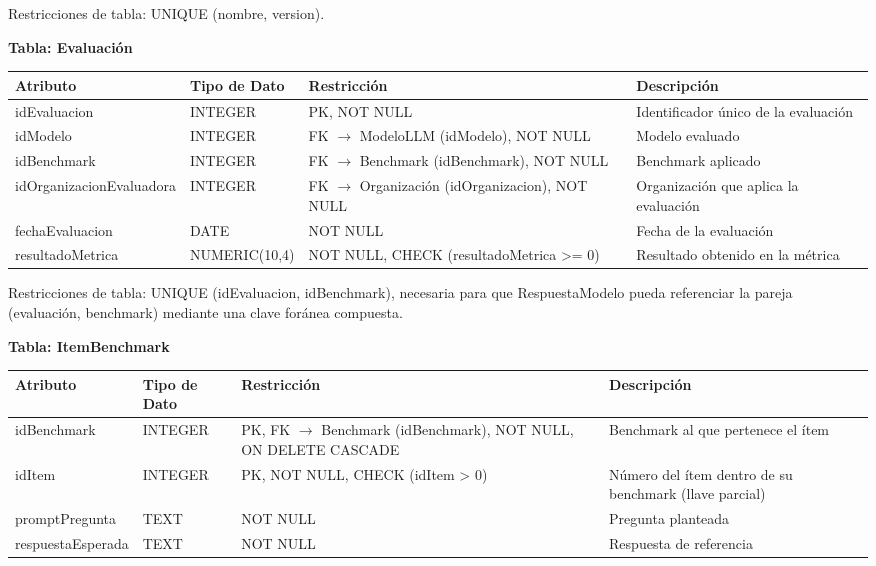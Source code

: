 \documentclass[12pt,a4paper]{article}
\begin{document}
Restricciones de tabla: UNIQUE (nombre, version).

\textbf{Tabla: Evaluación}

\begin{longtable}{|>{\raggedright\arraybackslash}p{3.45cm}|>{\raggedright\arraybackslash}p{3.45cm}|>{\raggedright\arraybackslash}p{3.45cm}|>{\raggedright\arraybackslash}p{3.45cm}|}
\hline
\textbf{Atributo} & \textbf{Tipo de Dato} & \textbf{Restricción} & \textbf{Descripción} \\
\hline
idEvaluacion & INTEGER & PK, NOT NULL & Identificador único de la evaluación \\
\hline
idModelo & INTEGER & FK $\rightarrow$ ModeloLLM (idModelo), NOT NULL & Modelo evaluado \\
\hline
idBenchmark & INTEGER & FK $\rightarrow$ Benchmark (idBenchmark), NOT NULL & Benchmark aplicado \\
\hline
idOrganizacion\allowbreak Evaluadora & INTEGER & FK $\rightarrow$ Organización (idOrganizacion), NOT NULL & Organización que aplica la evaluación \\
\hline
fechaEvaluacion & DATE & NOT NULL & Fecha de la evaluación \\
\hline
resultadoMetrica & NUMERIC(10,4) & NOT NULL, CHECK (resultadoMetrica >= 0) & Resultado obtenido en la métrica \\
\hline
\end{longtable}

Restricciones de tabla: UNIQUE (idEvaluacion, idBenchmark), necesaria para que RespuestaModelo pueda referenciar la pareja (evaluación, benchmark) mediante una clave foránea compuesta.

\textbf{Tabla: ItemBenchmark}

\begin{longtable}{|>{\raggedright\arraybackslash}p{3.45cm}|>{\raggedright\arraybackslash}p{3.45cm}|>{\raggedright\arraybackslash}p{3.45cm}|>{\raggedright\arraybackslash}p{3.45cm}|}
\hline
\textbf{Atributo} & \textbf{Tipo de Dato} & \textbf{Restricción} & \textbf{Descripción} \\
\hline
idBenchmark & INTEGER & PK, FK $\rightarrow$ Benchmark (idBenchmark), NOT NULL, ON DELETE CASCADE & Benchmark al que pertenece el ítem \\
\hline
idItem & INTEGER & PK, NOT NULL, CHECK (idItem > 0) & Número del ítem dentro de su benchmark (llave parcial) \\
\hline
promptPregunta & TEXT & NOT NULL & Pregunta planteada \\
\hline
respuestaEsperada & TEXT & NOT NULL & Respuesta de referencia \\
\hline
\end{longtable}
\end{document}
